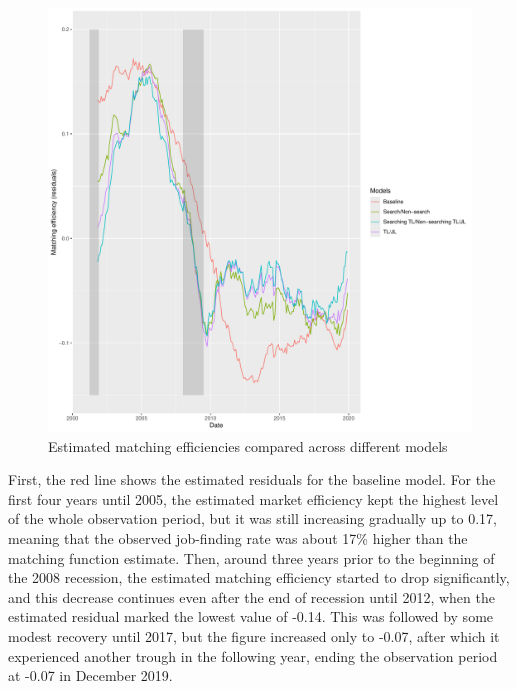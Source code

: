 \documentclass[a4paper, 11pt, tikz]{article}
\begin{document}
\begin{figure}
  \centering
  \includegraphics[width=150mm]{efficiency.pdf}
  \caption{Estimated matching efficiencies compared across different models}
  \label{efficiency}
\end{figure}

First, the red line shows the estimated residuals for the baseline model.
For the first four years until 2005, the estimated market efficiency kept the highest level of the whole observation period, but it was still increasing gradually up to 0.17, meaning that the observed job-finding rate was about 17\% higher than the matching function estimate.
Then, around three years prior to the beginning of the 2008 recession, the estimated matching efficiency started to drop significantly, and this decrease continues even after the end of recession until 2012, when the estimated residual marked the lowest value of -0.14.
This was followed by some modest recovery until 2017, but the figure increased only to -0.07, after which it experienced another trough in the following year, ending the observation period at -0.07 in December 2019.
\end{document}
